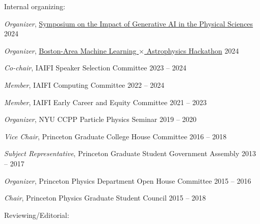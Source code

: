 \documentclass[letterpaper,11pt]{article}
\newenvironment{packed_itemize}{
\begin{itemize}[label=\raisebox{0.25ex}{\tiny$\bullet$}]
  \setlength{\itemsep}{4.2pt}
  \setlength{\parskip}{0pt}
  \setlength{\parsep}{0pt}}{\end{itemize}
}
\begin{document}
  \noindent
Internal organizing:
  \begin{packed_itemize}
  \item \emph{Organizer}, \href{https://iaifi.org/generative-ai-workshop}{Symposium on the Impact of Generative AI in the Physical Sciences}  \hfill 2024
  \item \emph{Organizer}, \href{https://iaifi.org/hackathon.html}{Boston-Area Machine Learning $\times$ Astrophysics Hackathon}  \hfill 2024
  \item \emph{Co-chair}, IAIFI Speaker Selection Committee  \hfill 2023 -- 2024
  \item \emph{Member}, IAIFI Computing Committee  \hfill 2022 -- 2024
  \item \emph{Member}, IAIFI Early Career and Equity Committee  \hfill 2021 -- 2023
  \item \emph{Organizer}, NYU CCPP Particle Physics Seminar \hfill 2019 -- 2020
  \item \emph{Vice Chair}, Princeton Graduate College House Committee \hfill 2016 -- 2018
  \item \emph{Subject Representative}, Princeton Graduate Student Government Assembly \hfill 2013 -- 2017
  \item \emph{Organizer}, Princeton Physics Department Open House Committee  \hfill 2015 -- 2016
  \item \emph{Chair}, Princeton Physics Graduate Student Council \hfill 2015 -- 2018
\end{packed_itemize}
  \noindent
Reviewing/Editorial:
\end{document}
